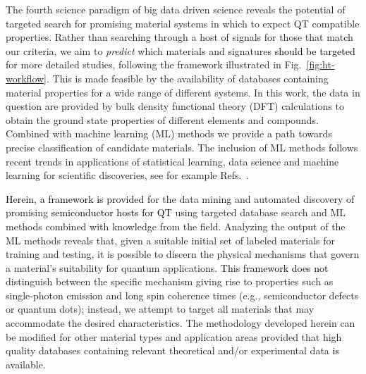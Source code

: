 \documentclass[superscriptaddress,unsortedaddress,
 amsmath,amssymb,
 aps,
]{revtex4-2}
\newcommand{\mrk}[1]{\textcolor{black}{#1}}
\begin{document}
The fourth science paradigm of big data driven science reveals the potential of targeted search for promising material systems in which to expect QT compatible properties. 
Rather than searching through a host of signals for those that match our criteria, we aim to \textit{predict} which materials and signatures \mrk{should be targeted} for more detailed studies, following the framework illustrated in Fig.~\ref{fig:ht-workflow}. 
This is made feasible by the availability of databases containing material properties for a wide range of different systems. In this work, the data in question are provided by bulk density functional theory (DFT) calculations to obtain the ground state properties of different elements and compounds. Combined with machine learning (ML) methods we provide a path towards precise classification of candidate materials. The inclusion of ML methods follows recent trends in applications of statistical learning, data science and machine learning for scientific discoveries, see for example Refs.~\cite{deiana2021,Carleo2019}. 

\mrk{Herein, a framework is provided} for the data mining and automated discovery of promising \mrk{semiconductor hosts for QT} using targeted database search and ML methods combined with knowledge from the field. 
Analyzing the output of the ML methods reveals that, given a suitable initial set of labeled materials for training and testing, it is possible to discern the physical mechanisms that govern a material's suitability for quantum applications.  
\mrk{This framework does not} distinguish between the specific mechanism giving rise to properties such as single-photon emission and long spin coherence times (e.g., semiconductor defects or quantum dots); instead, we attempt to target all materials that may accommodate the desired characteristics.  
The methodology developed herein can be modified for other material types and application areas provided that high quality databases containing relevant theoretical and/or experimental data \mrk{is} available. 
\end{document}
